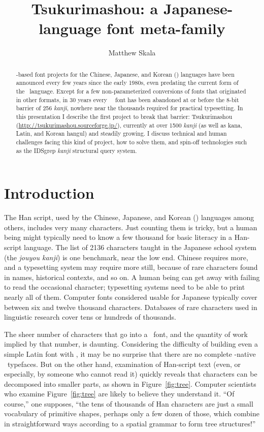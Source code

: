 \documentclass{ltugboat}
\title{Tsukurimashou: a Japanese-language font meta-family}
\author{Matthew Skala}
\begin{document}
\maketitle

\begin{abstract}
\MF-based font projects for the Chinese, Japanese, and Korean (\CJK)
languages have been announced every few years since the early 1980s,
even predating the current form of the \MF\ language.  Except for a few
non-parameterized conversions of fonts that originated in other formats,
in 30 years every \MF\ \CJK\ font has been abandoned at or before the
8-bit barrier of 256 \emph{kanji}, nowhere near the thousands required for
practical typesetting.  In this presentation I describe the first
project to break that barrier: Tsukurimashou
(\url{http://tsukurimashou.sourceforge.jp/}), currently at over 1500
\emph{kanji} (as well as kana, Latin, and Korean hangul) and steadily growing.
I discuss technical and human challenges facing this kind of project,
how to solve them, and spin-off technologies such as the IDSgrep
\emph{kanji} structural query system.
\end{abstract}


\section{Introduction}

The Han script, used by the Chinese, Japanese, and Korean (\CJK) languages
among others, includes very many characters.  Just counting them is tricky,
but a human being might typically need to know a few thousand for basic
literacy in a Han-script language.  The list of 2136 characters taught in
the Japanese school system (the \emph{jouyou kanji}) is one benchmark, near
the low end.  Chinese requires more, and a typesetting system may require
more still, because of rare characters found in names, historical contexts,
and so on.  A human being can get away with failing to read the occasional
character; typesetting systems need to be able to print nearly all of them. 
Computer fonts considered usable for Japanese typically cover between six
and twelve thousand characters.  Databases of rare characters used in
linguistic research cover tens or hundreds of thousands.

The sheer number of characters that go into a \CJK\ font, and the quantity
of work implied by that number, is daunting.  Considering the difficulty of
building even a simple Latin font with \MF, it may be no surprise that there
are no complete \MF-native \CJK\ typefaces.  But on the other hand,
examination of Han-script text (even, or especially, by someone who cannot
read it) quickly reveals that characters can be decomposed into smaller
parts, as shown in Figure~\ref{fig:tree}.  Computer scientists who examine
Figure~\ref{fig:tree} are likely to believe they understand it.  ``Of
course,'' one supposes, ``the tens of thousands of Han characters are just a
small vocabulary of primitive shapes, perhaps only a few dozen of those,
which combine in straightforward ways according to a spatial grammar to form
tree structures!''
\end{document}
